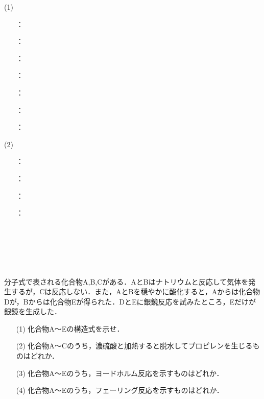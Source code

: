 \documentclass[a4paper,12pt]{ltjsreport}
\begin{document}
\ans 
\begin{minipage}{0.5\linewidth}
\noindent (1)\begin{itemize}
   \item [\fbox{ア}]： \\
  \item [\fbox{イ}]： \\
  \item [\fbox{ウ}]： \\
  \item [\fbox{エ}]：\\
  \item [\fbox{オ}]：\\
  \item [\fbox{カ}]：\\
  \item [\fbox{キ}]：
\end{itemize}
\end{minipage}
\begin{minipage}{0.5\linewidth}
\noindent (2)
\begin{itemize}
    \item[\fbox{ク}]：\\
      \item [\fbox{ケ}]：\\
  \item [\fbox{コ}]：\\
  \item [\fbox{サ}]：\\
    \item [　]　\\
  \item [　]　\\
  \item [　]　
\end{itemize}
\end{minipage}
\newpage
\begin{que}
分子式で表される化合物A,B,Cがある．AとBはナトリウムと反応して気体を発生するが，Cは反応しない．また，AとBを穏やかに酸化すると，Aからは化合物Dが，Bからは化合物Eが得られた．DとEに銀鏡反応を試みたところ，Eだけが銀鏡を生成した．
\begin{itemize}
    \item [(1)]化合物A〜Eの構造式を示せ．
    \item [(2)]化合物A〜Cのうち，濃硫酸と加熱すると脱水してプロピレンを生じるものはどれか．
    \item [(3)]化合物A〜Eのうち，ヨードホルム反応を示すものはどれか．
    \item [(4)]化合物A〜Eのうち，フェーリング反応を示すものはどれか．
\end{itemize}
\end{que}
\end{document}
